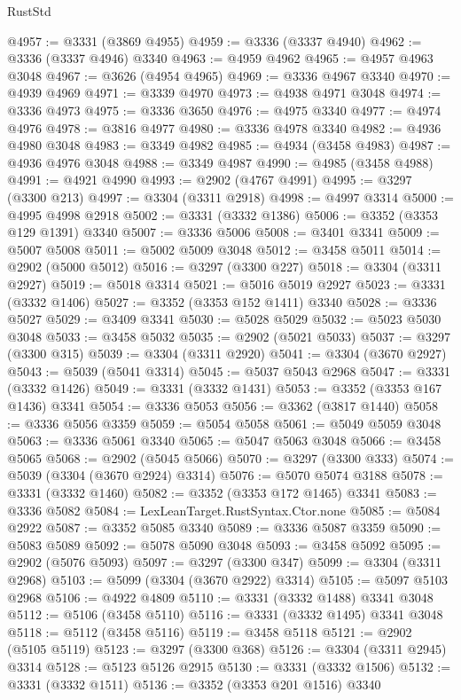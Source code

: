 \begin{lexlean}{RustStd}
\begin{coremodule}
@4957 := @3331 (@3869 @4955)
@4959 := @3336 (@3337 @4940)
@4962 := @3336 (@3337 @4946) @3340
@4963 := @4959 @4962
@4965 := @4957 @4963 @3048
@4967 := @3626 (@4954 @4965)
@4969 := @3336 @4967 @3340
@4970 := @4939 @4969
@4971 := @3339 @4970
@4973 := @4938 @4971 @3048
@4974 := @3336 @4973
@4975 := @3336 @3650
@4976 := @4975 @3340
@4977 := @4974 @4976
@4978 := @3816 @4977
@4980 := @3336 @4978 @3340
@4982 := @4936 @4980 @3048
@4983 := @3349 @4982
@4985 := @4934 (@3458 @4983)
@4987 := @4936 @4976 @3048
@4988 := @3349 @4987
@4990 := @4985 (@3458 @4988)
@4991 := @4921 @4990
@4993 := @2902 (@4767 @4991)
@4995 := @3297 (@3300 @213)
@4997 := @3304 (@3311 @2918)
@4998 := @4997 @3314
@5000 := @4995 @4998 @2918
@5002 := @3331 (@3332 @1386)
@5006 := @3352 (@3353 @129 @1391) @3340
@5007 := @3336 @5006
@5008 := @3401 @3341
@5009 := @5007 @5008
@5011 := @5002 @5009 @3048
@5012 := @3458 @5011
@5014 := @2902 (@5000 @5012)
@5016 := @3297 (@3300 @227)
@5018 := @3304 (@3311 @2927)
@5019 := @5018 @3314
@5021 := @5016 @5019 @2927
@5023 := @3331 (@3332 @1406)
@5027 := @3352 (@3353 @152 @1411) @3340
@5028 := @3336 @5027
@5029 := @3409 @3341
@5030 := @5028 @5029
@5032 := @5023 @5030 @3048
@5033 := @3458 @5032
@5035 := @2902 (@5021 @5033)
@5037 := @3297 (@3300 @315)
@5039 := @3304 (@3311 @2920)
@5041 := @3304 (@3670 @2927)
@5043 := @5039 (@5041 @3314)
@5045 := @5037 @5043 @2968
@5047 := @3331 (@3332 @1426)
@5049 := @3331 (@3332 @1431)
@5053 := @3352 (@3353 @167 @1436) @3341
@5054 := @3336 @5053
@5056 := @3362 (@3817 @1440)
@5058 := @3336 @5056 @3359
@5059 := @5054 @5058
@5061 := @5049 @5059 @3048
@5063 := @3336 @5061 @3340
@5065 := @5047 @5063 @3048
@5066 := @3458 @5065
@5068 := @2902 (@5045 @5066)
@5070 := @3297 (@3300 @333)
@5074 := @5039 (@3304 (@3670 @2924) @3314)
@5076 := @5070 @5074 @3188
@5078 := @3331 (@3332 @1460)
@5082 := @3352 (@3353 @172 @1465) @3341
@5083 := @3336 @5082
@5084 := LexLeanTarget.RustSyntax.Ctor.none
@5085 := @5084 @2922
@5087 := @3352 @5085 @3340
@5089 := @3336 @5087 @3359
@5090 := @5083 @5089
@5092 := @5078 @5090 @3048
@5093 := @3458 @5092
@5095 := @2902 (@5076 @5093)
@5097 := @3297 (@3300 @347)
@5099 := @3304 (@3311 @2968)
@5103 := @5099 (@3304 (@3670 @2922) @3314)
@5105 := @5097 @5103 @2968
@5106 := @4922 @4809
@5110 := @3331 (@3332 @1488) @3341 @3048
@5112 := @5106 (@3458 @5110)
@5116 := @3331 (@3332 @1495) @3341 @3048
@5118 := @5112 (@3458 @5116)
@5119 := @3458 @5118
@5121 := @2902 (@5105 @5119)
@5123 := @3297 (@3300 @368)
@5126 := @3304 (@3311 @2945) @3314
@5128 := @5123 @5126 @2915
@5130 := @3331 (@3332 @1506)
@5132 := @3331 (@3332 @1511)
@5136 := @3352 (@3353 @201 @1516) @3340

\end{coremodule}
\end{lexlean}
